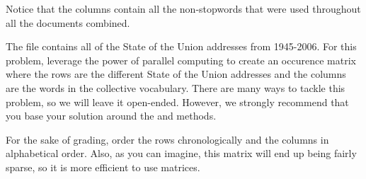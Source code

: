 \begin{problem}
Notice that the columns contain all the non-stopwords that were used throughout all the documents combined.

The  file contains all of the State of the Union addresses from 1945-2006. For this problem, leverage the power of parallel computing to create an occurence matrix where the rows are the different State of the Union addresses and the columns are the words in the collective vocabulary. There are many ways to tackle this problem, so we will leave it open-ended. However, we strongly recommend that you base your solution around the  and  methods.

For the sake of grading, order the rows chronologically and the columns in alphabetical order. Also, as you can imagine, this matrix will end up being fairly sparse, so it is more efficient to use  matrices.
\end{problem}
